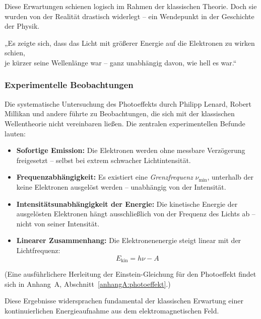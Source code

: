 Diese Erwartungen schienen logisch im Rahmen der klassischen Theorie. Doch sie wurden von der Realität drastisch widerlegt – ein Wendepunkt in der Geschichte der Physik.

\vspace{1em}
\begin{tcolorbox}[physikbox, title=Philipp Lenard (1902)\textit{ \cite{lenard1902} }]
	\label{box:Philipp Lenhard}
	\small
	„Es zeigte sich, dass das Licht mit größerer Energie auf die Elektronen zu wirken schien,\\
	je kürzer seine Wellenlänge war – ganz unabhängig davon, wie hell es war.“
\end{tcolorbox}

\subsubsection{Experimentelle Beobachtungen}

Die systematische Untersuchung des Photoeffekts durch Philipp Lenard, Robert Millikan und andere führte zu Beobachtungen, die sich mit der klassischen Wellentheorie nicht vereinbaren ließen. Die zentralen experimentellen Befunde lauten:

\begin{itemize}
	\item \textbf{Sofortige Emission:} Die Elektronen werden ohne messbare Verzögerung freigesetzt – selbst bei extrem schwacher Lichtintensität.
	\item \textbf{Frequenzabhängigkeit:} Es existiert eine \emph{Grenzfrequenz} \( \nu_{\text{min}} \), unterhalb der keine Elektronen ausgelöst werden – unabhängig von der Intensität.
	\item \textbf{Intensitätsunabhängigkeit der Energie:} Die kinetische Energie der ausgelösten Elektronen hängt ausschließlich von der Frequenz des Lichts ab – nicht von seiner Intensität.
	\item \textbf{Linearer Zusammenhang:} Die Elektronenenergie steigt linear mit der Lichtfrequenz:
	\[
	E_{\text{kin}} = h \nu - A
	\]
\end{itemize}
(Eine ausführlichere Herleitung der Einstein-Gleichung für den Photoeffekt findet sich in Anhang~A, Abschnitt~\ref{anhangA:photoeffekt}.)

Diese Ergebnisse widersprachen fundamental der klassischen Erwartung einer kontinuierlichen Energieaufnahme aus dem elektromagnetischen Feld.

